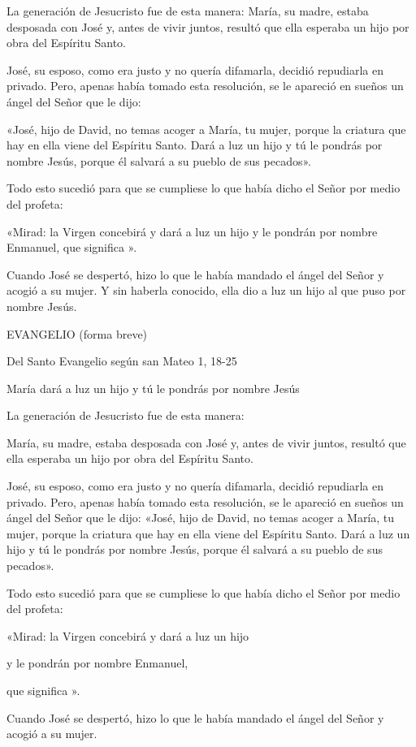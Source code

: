 \begin{body}
\begin{body}
La generación de Jesucristo fue de esta manera: María, su madre, estaba
desposada con José y, antes de vivir juntos, resultó que ella esperaba
un hijo por obra del Espíritu Santo.

José, su esposo, como era justo y no quería difamarla, decidió
repudiarla en privado. Pero, apenas había tomado esta resolución, se le
apareció en sueños un ángel del Señor que le dijo:

«José, hijo de David, no temas acoger a María, tu mujer, porque la
criatura que hay en ella viene del Espíritu Santo. Dará a luz un hijo y
tú le pondrás por nombre Jesús, porque él salvará a su pueblo de sus
pecados».

Todo esto sucedió para que se cumpliese lo que había dicho el Señor por
medio del profeta:

«Mirad: la Virgen concebirá y dará a luz un hijo y le pondrán por nombre
Enmanuel, que significa ».

Cuando José se despertó, hizo lo que le había mandado el ángel del Señor
y acogió a su mujer. Y sin haberla conocido, ella dio a luz un hijo al
que puso por nombre Jesús.

EVANGELIO (forma breve)

Del Santo Evangelio según san Mateo 1, 18-25

María dará a luz un hijo y tú le pondrás por nombre Jesús

La generación de Jesucristo fue de esta manera:

María, su madre, estaba desposada con José y, antes de vivir juntos,
resultó que ella esperaba un hijo por obra del Espíritu Santo.

José, su esposo, como era justo y no quería difamarla, decidió
repudiarla en privado. Pero, apenas había tomado esta resolución, se le
apareció en sueños un ángel del Señor que le dijo: «José, hijo de David,
no temas acoger a María, tu mujer, porque la criatura que hay en ella
viene del Espíritu Santo. Dará a luz un hijo y tú le pondrás por nombre
Jesús, porque él salvará a su pueblo de sus pecados».

Todo esto sucedió para que se cumpliese lo que había dicho el Señor por
medio del profeta:

«Mirad: la Virgen concebirá y dará a luz un hijo

y le pondrán por nombre Enmanuel,

que significa ».

Cuando José se despertó, hizo lo que le había mandado el ángel del Señor
y acogió a su mujer.


\end{body}
\end{body}
